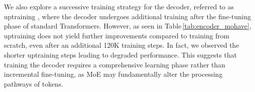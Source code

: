 We also explore a successive training strategy for the decoder, referred to as uptraining \cite{ainslie2023gqa}, where the decoder \ourmodel undergoes additional training after the fine-tuning phase of standard Transformers. However, as seen in Table\,\ref{tab:encoder_mohave}, uptraining does not yield further improvements compared to training from scratch, even after an additional 120K training steps. In fact, we observed the shorter uptraining steps leading to degraded performance. This suggests that training the decoder \ourmodel requires a comprehensive learning phase rather than incremental fine-tuning, as MoE  may fundamentally alter the processing pathways of tokens.

